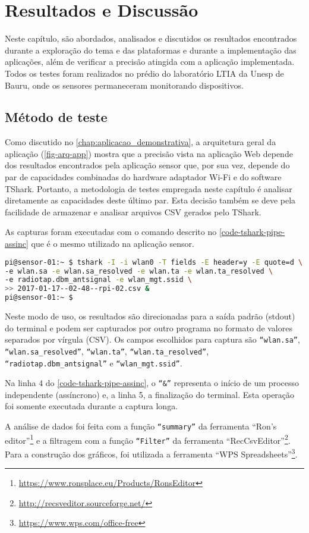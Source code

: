 \chapter{Resultados e Discussão}
\label{chap:resultados}

Neste capítulo, são abordados, analisados e discutidos os resultados encontrados
durante a exploração do tema e das plataformas e durante a implementação das
aplicações, além de verificar a precisão atingida com a aplicação implementada.
Todos os testes foram realizados no prédio do laboratório LTIA da Unesp de
Bauru, onde os sensores permaneceram monitorando dispositivos.

\section{Método de teste}
\label{sec:metodo-teste}

Como discutido no \autoref{chap:aplicacao_demonstrativa}, a arquitetura geral da
aplicação (\autoref{fig-arq-app}) mostra que a precisão vista na aplicação Web
depende dos resultados encontrados pela aplicação sensor que, por sua vez,
depende do par de capacidades combinadas do hardware adaptador Wi-Fi e do
software TShark. Portanto, a metodologia de testes empregada neste capítulo é
analisar diretamente as capacidades deste último par. Esta decisão também se
deve pela facilidade de armazenar e analisar arquivos CSV gerados pelo TShark.

As capturas foram executadas com o comando descrito no
\autoref{code-tshark-pipe-assinc} que é o mesmo utilizado na aplicação sensor.

\begin{lstlisting}[language=bash,caption={TShark e redirecionamento da saída para arquivo assíncrono},label=code-tshark-pipe-assinc]
pi@sensor-01:~ $ tshark -I -i wlan0 -T fields -E header=y -E quote=d \
-e wlan.sa -e wlan.sa_resolved -e wlan.ta -e wlan.ta_resolved \
-e radiotap.dbm_antsignal -e wlan_mgt.ssid \
>> 2017-01-17--02-48--rpi-02.csv &
pi@sensor-01:~ $
\end{lstlisting}

Neste modo de uso, os resultados são direcionadas para a saída padrão (stdout)
do terminal e podem ser capturados por outro programa no formato de valores
separados por vírgula (CSV). Os campos escolhidos para captura são
\texttt{``wlan.sa''}, \texttt{``wlan.sa\_resolved''}, \texttt{``wlan.ta''},
\texttt{``wlan.ta\_resolved''}, \texttt{``radiotap.dbm\_antsignal''} e
\texttt{``wlan\_mgt.ssid''}.

Na linha 4 do \autoref{code-tshark-pipe-assinc}, o \texttt{``\&''} representa o início
de um processo independente (assíncrono) e, a linha 5, a finalização do terminal.
Esta operação foi somente executada durante a captura longa.

A análise de dados foi feita com a função \texttt{``summary''} da ferramenta
``Ron’s editor''\footnote{\url{https://www.ronsplace.eu/Products/RonsEditor}}
e a filtragem com a função \texttt{``Filter''} da ferramenta
``RecCsvEditor''\footnote{\url{http://recsveditor.sourceforge.net/}}. Para a
construção dos gráficos, foi utilizada a ferramenta
``WPS Spreadsheets''\footnote{\url{https://www.wps.com/office-free}}.
